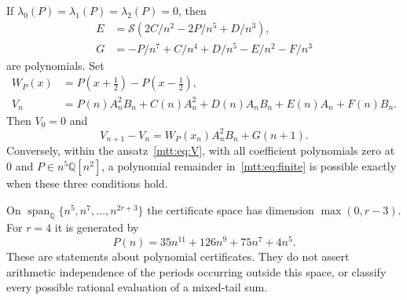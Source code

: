 \begin{theorem}\label{mtt:thm:certificate}
If $\lambda_0(P)=\lambda_1(P)=\lambda_2(P)=0$, then
\begin{align}
 E&=\mathcal S(2C/n^2-2P/n^5+D/n^3),\label{mtt:eq:E}\\
 G&=-P/n^7+C/n^4+D/n^5-E/n^2-F/n^3\label{mtt:eq:G}
\end{align}
are polynomials. Set
\begin{align}
 W_P(x)&=P(x+\tfrac12)-P(x-\tfrac12),\label{mtt:eq:weight}\\
 V_n&=P(n)A_n^2B_n+C(n)A_n^2+D(n)A_nB_n
             +E(n)A_n+F(n)B_n.\label{mtt:eq:V}
\end{align}
Then $V_0=0$ and
\begin{equation}\label{mtt:eq:finite}
 V_{n+1}-V_n=W_P(x_n)A_n^2B_n+G(n+1).
\end{equation}
Conversely, within the ansatz~\eqref{mtt:eq:V}, with all coefficient
polynomials zero at $0$ and $P\in n^5\mathbb Q[n^2]$, a polynomial
remainder in~\eqref{mtt:eq:finite} is possible exactly when these three
conditions hold.

On $\operatorname{span}_{\mathbb Q}\{n^5,n^7,\ldots,n^{2r+3}\}$ the
certificate space has dimension $\max(0,r-3)$. For $r=4$ it is generated by
\begin{equation}\label{mtt:eq:firstP}
 P(n)=35n^{11}+126n^9+75n^7+4n^5.
\end{equation}
These are statements about polynomial certificates. They do not assert
arithmetic independence of the periods occurring outside this space, or
classify every possible rational evaluation of a mixed-tail sum.
\end{theorem}
